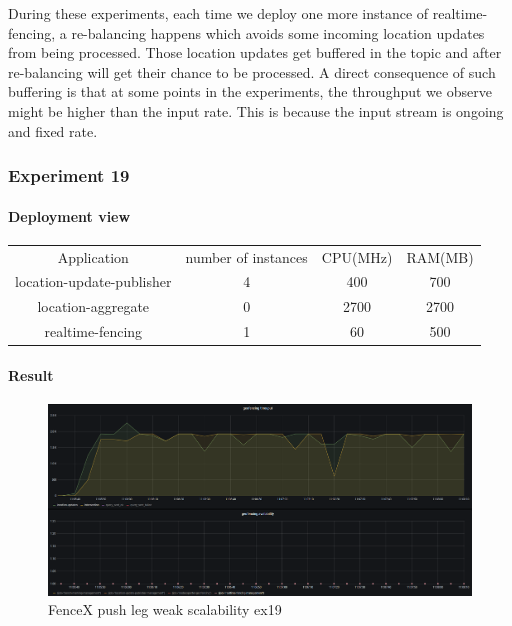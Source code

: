 \documentclass[a4]{report}
\begin{document}
        During these experiments, each time we deploy one more instance of realtime-fencing, a re-balancing happens which
        avoids some incoming location updates from being processed.
        Those location updates get buffered in the topic and after re-balancing will get their chance to be processed.
        A direct consequence of such buffering is that at some points in the experiments, the throughput we observe might be
        higher than the input rate.
        This is because the input stream is ongoing and fixed rate.

        \clearpage

        \subsubsection{Experiment 19}

        \paragraph{Deployment view}
        \begin{center}
            \begin{tabular}{ c c c c }
                Application               & number of instances & CPU(MHz) & RAM(MB) \\
                location-update-publisher & 4                   & 400      & 700     \\
                location-aggregate        & 0                   & 2700     & 2700    \\
                realtime-fencing          & 1                   & 60       & 500     \\
            \end{tabular}
        \end{center}

        \paragraph{Result}
        \begin{figure}[ht]
            \caption{FenceX push leg weak scalability ex19}
            \label{fig:ex19}
            \includegraphics[scale=0.4]{images/evaluation/ex19-benchmarking-ongoing-1per16sec.png}
        \end{figure}
\end{document}

